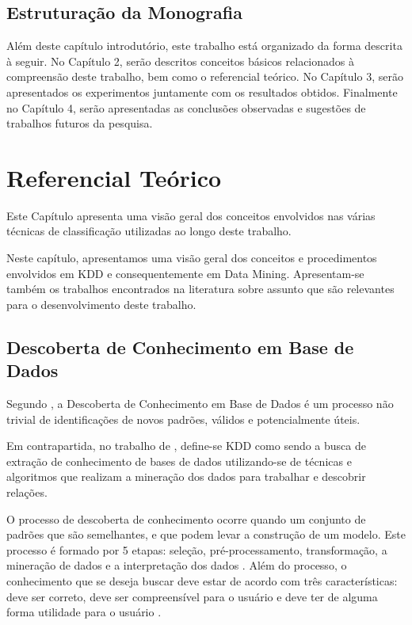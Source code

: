 \documentclass[
	12pt,				%
	openright,			%
	oneside,	
	a4paper,				%
	english,				%
	brazil				%
]{abntex2/abntex2} %
\begin{document}
	\section{Estruturação da Monografia}
	
		Além deste capítulo introdutório, este trabalho está organizado da forma descrita à seguir. No Capítulo 2, serão descritos conceitos básicos relacionados à compreensão deste trabalho, bem como o referencial teórico. No Capítulo 3, serão apresentados os experimentos juntamente com os resultados obtidos. Finalmente no Capítulo 4, serão apresentadas as conclusões observadas e sugestões de trabalhos futuros da pesquisa.

\chapter{Referencial Teórico}

Este Capítulo apresenta uma visão geral dos conceitos envolvidos nas várias técnicas de classificação utilizadas ao longo deste trabalho.

Neste capítulo, apresentamos uma visão geral dos conceitos e procedimentos envolvidos em KDD e consequentemente em Data Mining. Apresentam-se também os trabalhos encontrados na literatura sobre assunto que são relevantes para o desenvolvimento deste trabalho.

	\section{Descoberta de Conhecimento em Base de Dados}
	
	Segundo \cite{fayyad:1996}, a Descoberta de Conhecimento em Base de Dados é um processo não trivial de identificações de novos padrões, válidos e potencialmente úteis.
	
	Em contrapartida, no trabalho de \cite{thome:2002}, define-se KDD como sendo a busca de extração de conhecimento de bases de dados utilizando-se de técnicas e algoritmos que realizam a mineração dos dados para trabalhar e descobrir relações.
	
	O processo de descoberta de conhecimento ocorre quando um conjunto de padrões que são semelhantes, e que podem levar a construção de um modelo. Este processo é formado por 5 etapas: seleção, pré-processamento, transformação, a mineração de dados e a interpretação dos dados \cite{fayyad:1996}. Além do processo, o conhecimento que se deseja buscar deve estar de acordo com três características: deve ser correto, deve ser compreensível para o usuário e deve ter de alguma forma utilidade para o usuário \cite{freitas:2000}.
	
\end{document}
